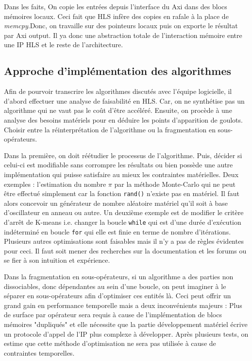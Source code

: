 \documentclass[12pt,a4paper]{article}
\begin{document}
Dans les faits, On copie les entrées depuis l'interface du Axi dans des blocs mémoires locaux. Ceci fait que HLS infère des copies en rafale à la place de \textit{memcpy}.Donc, on travaille sur des pointeurs locaux puis on exporte le résultat par Axi output. Il ya donc une abstraction totale de l'interaction mémoire entre une IP HLS et le reste de l'architecture.

\subsection{Approche d'implémentation des algorithmes}
Afin de pourvoir transcrire les algorithmes discutés avec l'équipe logicielle, il d'abord effectuer une analyse de faisabilité en HLS. Car, on ne synthétise  pas un algorithme qui ne vaut pas le coût d'être accéléré. Ensuite, on procède à une analyse des besoins matériels pour en déduire les points d'apparition de goulots. Choisir entre la réinterprétation de l'algorithme ou la fragmentation en sous-opérateurs. 

Dans la première, on doit réétudier le processus de l'algorithme. Puis, décider si celui-ci est modifiable sans corrompre les résultats ou bien possède une autre implémentation qui puisse satisfaire au mieux les contraintes matérielles. Deux exemples : l'estimation du nombre $\pi$ par la méthode Monte-Carlo qui ne peut être effectué simplement car la fonction \texttt{rand()} n'existe pas en matériel. Il faut alors concevoir un générateur de nombre aléatoire matériel qu'il soit à base d'oscillateur en anneau ou autre. Un deuxième exemple est de modifier le critère d'arrêt de K-means i.e. changer la boucle \texttt{while} qui est d'une durée d'exécution indéterminé en boucle \texttt{for} qui elle est finie en terme de nombre d'itérations. Plusieurs autres optimisations sont faisables mais il n'y a pas de règles évidentes pour ceci. Il faut soit mener des recherches sur la documentation et les forums ou se fier à son intuition et expérience.

Dans la fragmentation en sous-opérateurs, si un algorithme a des parties non dissociables, donc dépendantes au sein d'une boucle, on peut imaginer à le séparer en sous-opérateurs afin d'optimiser ces entités là. Ceci peut offrir un grand gain en performance temporelle mais a deux inconvénients majeurs : Plus de surface par opérateur sera requis à cause de l'implémentation de blocs mémoires "dupliqués" et elle nécessite que la partie développement matériel écrive un protocole d'appel de l'IP plus complexe à développer. Après plusieurs tests, on estime que cette méthode d'optimisation ne sera pas utilisée à cause de contraintes temporelles.
\end{document}
